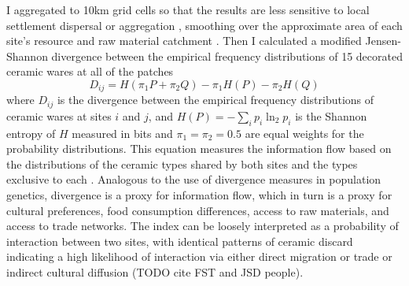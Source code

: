 \documentclass[10pt]{iopart}
\begin{document}
I aggregated to 10km grid cells so that the results are less sensitive to local settlement dispersal or aggregation \parencite{paliou2015}, smoothing over the approximate area of each site's resource and raw material catchment \parencite{varien1999}. Then I calculated a modified Jensen-Shannon divergence between the empirical frequency distributions of 15 decorated ceramic wares at all of the patches
\begin{equation}
    D_{ij} = H\left(\pi_1P + \pi_2Q\right) - \pi_1H(P) - \pi_2H(Q)
\end{equation}
where $D_{ij}$ is the divergence between the empirical frequency distributions of ceramic wares at sites $i$ and $j$, and $H(P) = -\sum_i p_i \ln_2 p_i$ is the Shannon entropy of $H$ measured in bits and $\pi_1 = \pi_2 = 0.5$ are equal weights for the probability distributions. This equation measures the information flow based on the distributions of the ceramic types shared by both sites and the types exclusive to each \parencite{Masucci2011,PaoloMasucci2012}. Analogous to the use of divergence measures in population genetics, divergence is a proxy for information flow, which in turn is a proxy for cultural preferences, food consumption differences, access to raw materials, and access to trade networks. The index can be loosely interpreted as a probability of interaction between two sites, with identical patterns of ceramic discard indicating a high likelihood of interaction via either direct migration or trade or indirect cultural diffusion (TODO cite FST and JSD people).
\end{document}
